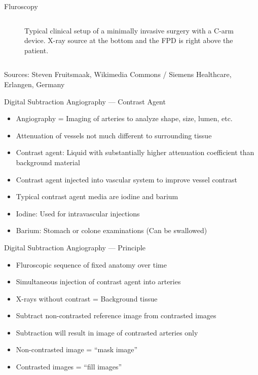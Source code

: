 \begin{frame}{Fluroscopy}
\begin{columns}[t, onlytextwidth]
\begin{column}{0.6\textwidth}
\begin{figure}
            \caption{Typical clinical setup of a minimally invasive surgery with a C-arm device. X-ray source at the bottom and the FPD is right above the patient.}%
        \end{figure}
        \end{column}
    \end{columns}
    \begin{flushright}
        \scriptsize Sources: Steven Fruitsmaak, Wikimedia Commons / Siemens Healthcare, Erlangen, Germany
    \end{flushright}
\end{frame}



\begin{frame}{Digital Subtraction Angiography --- Contrast Agent}
    \begin{itemize}
        \item Angiography = Imaging of arteries to analyze shape, size, lumen, etc.
        \item {\Huge \Lightning} Attenuation of vessels not much different to surrounding tissue {\Huge \Lightning}
        \item Contrast agent: Liquid with substantially higher attenuation coefficient than background material
        \item Contrast agent injected into vascular system to improve vessel contrast
        \item Typical contrast agent media are iodine and barium
        \item Iodine: Used for intravascular injections
        \item Barium: Stomach or colone examinations (Can be swallowed)
    \end{itemize}
\end{frame}

\begin{frame}{Digital Subtraction Angiography --- Principle}
    \begin{itemize}
        \item Fluroscopic sequence of fixed anatomy over time
        \item Simultaneous injection of contrast agent into arteries
        \item X-rays without contrast = Background tissue
        \item Subtract non-contrasted reference image from contrasted images
        \item Subtraction will result in image of contrasted arteries only
        \item Non-contrasted image = ``mask image''
        \item Contrasted images = ``fill images''
    \end{itemize}
\end{frame}

